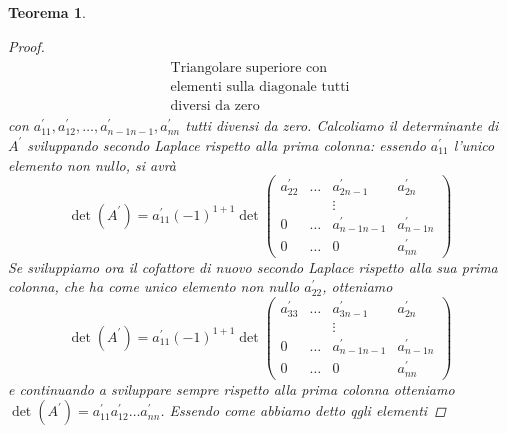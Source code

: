 \documentclass{book}
\newtheorem{teorema}{Teorema}
\begin{document}
\begin{teorema}
\begin{proof}
\begin{eqnarray*}
\begin{matrix}
                                 \text{Triangolare superiore con}\\
                                 \text{elementi sulla diagonale tutti}\\
                                 \text{diversi da zero}
                                 \end{matrix}
    \end{eqnarray*}
    con $a^\prime_{11},a^\prime_{12},\dots,a^\prime_{n-1n-1}, a^\prime_{nn}$ tutti divensi da zero.
    Calcoliamo il determinante di $A^\prime$ sviluppando secondo Laplace rispetto alla prima
    colonna: essendo $a^\prime_{11}$ l'unico elemento non nullo, si avrà
    \begin{equation*}
      \det(A^\prime)=a^\prime_{11}(-1)^{1+1}\det\begin{pmatrix}
                                                  a^\prime_{22} & \dots &a^\prime_{2n-1}
                                                  & a^\prime_{2n}\\
                               		          && \vdots\\
                  0 & \dots &a^\prime_{n-1n-1}& a^\prime_{n-1n}\\
                                                  0 & \dots & 0 & a^\prime_{nn}
                                                \end{pmatrix}
    \end{equation*}
    \clearpage
    Se sviluppiamo ora il cofattore di nuovo secondo Laplace rispetto alla sua prima colonna,
    che ha come unico elemento non nullo $a_{22}^\prime$, otteniamo
    \begin{equation*}
      \det(A^\prime)=a^\prime_{11}(-1)^{1+1}\det\begin{pmatrix}
                                                  a^\prime_{33} & \dots &a^\prime_{3n-1}
                                                  & a^\prime_{2n}\\
                               		          && \vdots\\
                  0 & \dots &a^\prime_{n-1n-1}& a^\prime_{n-1n}\\
                                                  0 & \dots & 0 & a^\prime_{nn}
                                                \end{pmatrix}
    \end{equation*}
    e continuando a sviluppare sempre rispetto alla prima colonna otteniamo $\det (A^\prime)=
    a^\prime_{11}a_{12}^\prime\dots a_{nn}^\prime$. Essendo come abbiamo detto qgli elementi

\end{proof}
\end{teorema}
\end{document}
